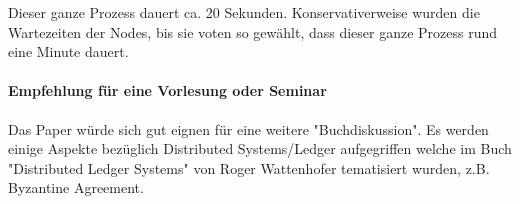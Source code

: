 \documentclass[11pt,a4paper]{article}
\begin{document}
Dieser ganze Prozess dauert ca. 20 Sekunden. Konservativerweise wurden die Wartezeiten der Nodes, bis sie voten so gew\"ahlt, dass dieser ganze Prozess rund eine Minute dauert.



\newpage

\paragraph*{Empfehlung f\"ur eine Vorlesung oder Seminar}
Das Paper \cite{Gilad:2017:ASB:3132747.3132757} w\"urde sich gut eignen f\"ur eine weitere "Buchdiskussion".
Es werden einige Aspekte bez\"uglich Distributed Systems/Ledger aufgegriffen welche 
im Buch "Distributed Ledger Systems" von Roger Wattenhofer tematisiert wurden, z.B. Byzantine Agreement.

\cite{Gilad:2017:ASB:3132747.3132757}
\cite{Chen:2017}


\newpage


% 
{}
\end{document}
